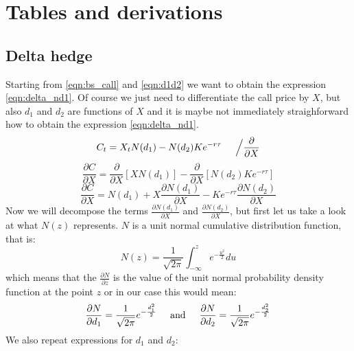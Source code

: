 \documentclass[times, utf8, diplomski]{fer}
\begin{document}
\appendix
\chapter{Tables and derivations}
\section{Delta hedge} \label{sec:obtain_delta_hedge}

Starting from \ref{eqn:bs_call} and \ref{eqn:d1d2} we want to obtain the expression \ref{eqn:delta_nd1}. Of course we just need to differentiate the call price by $X$, but also $d_1$ and $d_2$ are functions of $X$ and it is maybe not immediately straighforward how to obtain the expression \ref{eqn:delta_nd1}. 
\begin{equation*}
	C_t = X_tN(d_1) - N(d_2)Ke^{-r\tau} \hspace{0.5cm} \Big/ \frac{\partial}{\partial X}
\end{equation*}
\begin{equation*}
	\frac{\partial C}{\partial X} = \frac{\partial}{\partial X}\left[ XN(d_1) \right] - \frac{\partial}{\partial X} \left[ N(d_2)Ke^{-r\tau} \right]
\end{equation*}
\begin{equation} \label{eqn:dC_dX}
	\frac{\partial C}{\partial X} = N(d_1) + X\frac{\partial N(d_1)}{\partial X} - Ke^{-r\tau}\frac{\partial N(d_2)}{\partial X}
\end{equation} Now we will decompose the terms $\frac{\partial N(d_1)}{\partial X}$ and $\frac{\partial N(d_2)}{\partial X}$, but first let us take a look at what $N(z)$ represents. $N$ is a unit normal cumulative distribution function, that is:
\begin{equation} 
	N(z) = \frac{1}{\sqrt{2\pi}} \int_{-\infty}^{z} e^{-\frac{u^2}{2}}du
\end{equation} which means that the $\frac{\partial N}{\partial z}$ is the value of the unit normal probability density function at the point $z$ or in our case this would mean:
\begin{equation}
	\frac{\partial N}{\partial d_1} = \frac{1}{\sqrt{2\pi}} e^{-\frac{d_1^2}{2}} \hspace{0.5cm} \mbox{and} \hspace{0.5cm} \frac{\partial N}{\partial d_2} = \frac{1}{\sqrt{2\pi}} e^{-\frac{d_2^2}{2}}
\end{equation} We also repeat expressions for $d_1$ and $d_2$:
\end{document}
